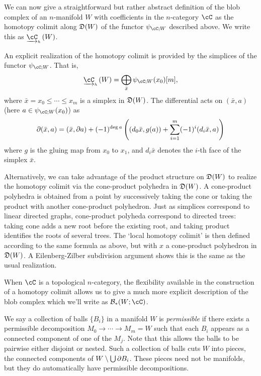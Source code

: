 \documentclass{pnastwo}
\begin{document}
\begin{article}
We can now give a straightforward but rather abstract definition of the blob complex of an $n$-manifold $W$
with coefficients in the $n$-category $\cC$ as the homotopy colimit along $\mathfrak{D}(W)$
of the functor $\psi_{\cC; W}$ described above. We write this as $\clh{\cC}(W)$.

An explicit realization of the homotopy colimit is provided by the simplices of the functor $\psi_{\cC; W}$. That is, $$\clh{\cC}(W) = \DirectSum_{\bar{x}} \psi_{\cC; W}(x_0)[m],$$ where $\bar{x} = x_0 \leq \cdots \leq x_m$ is a simplex in $\mathfrak{D}(W)$. The differential acts on $(\bar{x},a)$ (here $a \in \psi_{\cC; W}(x_0)$) as
$$\partial (\bar{x},a) = (\bar{x}, \partial a) + (-1)^{\deg a} \left( (d_0 \bar{x}, g(a)) + \sum_{i=1}^m (-1)^i (d_i \bar{x}, a) \right)$$
where $g$ is the gluing map from $x_0$ to $x_1$, and $d_i \bar{x}$ denotes the $i$-th face of the simplex $\bar{x}$.

Alternatively, we can take advantage of the product structure on $\mathfrak{D}(W)$ to realize the homotopy colimit via the cone-product polyhedra in $\mathfrak{D}(W)$. A cone-product polyhedra is obtained from a point by successively taking the cone or taking the product with another cone-product polyhedron. Just as simplices correspond to linear directed graphs, cone-product polyheda correspond to directed trees: taking cone adds a new root before the existing root, and taking product identifies the roots of several trees. The `local homotopy colimit' is then defined according to the same formula as above, but with $x$ a cone-product polyhedron in $\mathfrak{D}(W)$.
A Eilenberg-Zilber subdivision argument shows this is the same as the usual realization.

When $\cC$ is a topological $n$-category,
the flexibility available in the construction of a homotopy colimit allows
us to give a much more explicit description of the blob complex which we'll write as $\bc_*(W; \cC)$. 

We say a collection of balls $\{B_i\}$ in a manifold $W$ is \emph{permissible}
if there exists a permissible decomposition $M_0\to\cdots\to M_m = W$ such that
each $B_i$ appears as a connected component of one of the $M_j$. Note that this allows the balls to be pairwise either disjoint or nested. Such a collection of balls cuts $W$ into pieces, the connected components of $W \setminus \bigcup \partial B_i$. These pieces need not be manifolds, but they do automatically have permissible decompositions.


\end{article}
\end{document}
